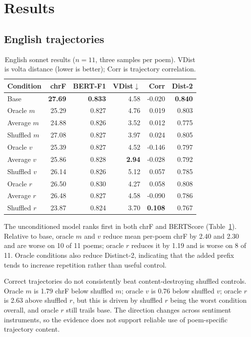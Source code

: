 \documentclass{article}
\begin{document}
\section{Results}

\subsection{English trajectories}

\begin{table}[h!]
\caption{English sonnet results ($n=11$, three samples per poem). VDist is volta distance (lower is better); Corr is trajectory correlation.}
\label{tab:english}
\centering
\scriptsize
\setlength{\tabcolsep}{4.5pt}
\begin{tabular}{lrrrrr}
\toprule
Condition & chrF & BERT-F1 & VDist$\downarrow$ & Corr & Dist-2 \\
\midrule
Base & \textbf{27.69} & \textbf{0.833} & 4.58 & -0.020 & \textbf{0.840} \\
Oracle $m$ & 25.29 & 0.827 & 4.76 & 0.019 & 0.803 \\
Average $m$ & 24.88 & 0.826 & 3.52 & 0.012 & 0.775 \\
Shuffled $m$ & 27.08 & 0.827 & 3.97 & 0.024 & 0.805 \\
Oracle $v$ & 25.39 & 0.827 & 4.52 & -0.146 & 0.797 \\
Average $v$ & 25.86 & 0.828 & \textbf{2.94} & -0.028 & 0.792 \\
Shuffled $v$ & 26.14 & 0.826 & 5.12 & 0.057 & 0.785 \\
Oracle $r$ & 26.50 & 0.830 & 4.27 & 0.058 & 0.808 \\
Average $r$ & 26.48 & 0.827 & 4.58 & -0.090 & 0.786 \\
Shuffled $r$ & 23.87 & 0.824 & 3.70 & \textbf{0.108} & 0.767 \\
\bottomrule
\end{tabular}
\end{table}

The unconditioned model ranks first in both chrF and BERTScore (Table~\ref{tab:english}). Relative to base, oracle $m$ and $v$ reduce mean per-poem chrF by 2.40 and 2.30 and are worse on 10 of 11 poems; oracle $r$ reduces it by 1.19 and is worse on 8 of 11. Oracle conditions also reduce Distinct-2, indicating that the added prefix tends to increase repetition rather than useful control.

Correct trajectories do not consistently beat content-destroying shuffled controls. Oracle $m$ is 1.79 chrF below shuffled $m$; oracle $v$ is 0.76 below shuffled $v$; oracle $r$ is 2.63 above shuffled $r$, but this is driven by shuffled $r$ being the worst condition overall, and oracle $r$ still trails base. The direction changes across sentiment instruments, so the evidence does not support reliable use of poem-specific trajectory content.
\end{document}
